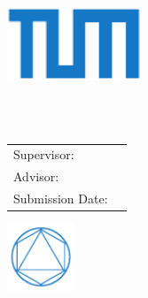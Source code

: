 \begin{titlepage}
  \centering

  \includegraphics[width=40mm]{pages/tum}

  \vspace{5mm}
  {\LARGE\MakeUppercase{\getFacultyTUM{}}}\\

  \vspace{5mm}
  {\large\MakeUppercase{\getUniversityTUM{}}}\\

  \vspace{15mm}
  {\Large \getDoctypeTUM{}}

  \vspace{10mm}
  {\huge\bfseries \getTitle{}\par}

  \vspace{15mm}
  {\LARGE\getAuthor{}}

  \vspace{15mm}
  \begin{tabular}{l l}
    Supervisor: & \getSupervisorTUM{} \\
    Advisor: & \getAdvisorTUM{} \\
    Submission Date: & \getSubmissionDate{} \\
  \end{tabular}

  \vspace{10mm}
  \includegraphics[width=20mm]{pages/faculty}
\end{titlepage}
